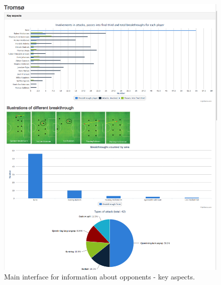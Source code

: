 \begin{figure}[ht!]
\centering
\includegraphics[width=1\textwidth]{images/general/team_analysis1.png}
\caption{Main interface for information about opponents - key aspects.}
\label{fig:team_analysis1}
\end{figure}

